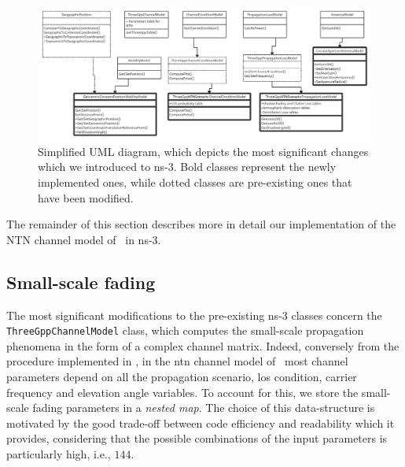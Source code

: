 \begin{figure}[t]
    \includegraphics[width=\textwidth]{Figures/ChannelNtn/uml-diagram.png}
    \caption{Simplified UML diagram, which depicts the most significant changes which we introduced to ns-3. Bold classes represent the newly implemented ones, while dotted classes are pre-existing ones that have been modified.}
    \label{fig:ntn-uml}
\end{figure}

The remainder of this section describes more in detail our implementation of the NTN channel model of~\cite{38811} in ns-3. 

\subsection{Small-scale fading}
The most significant modifications to the pre-existing ns-3 classes concern the \texttt{Three\-Gpp\-Channel\-Model} class, which computes the small-scale propagation phenomena in the form of a complex channel matrix. Indeed, conversely from the procedure implemented in \cite{zugno20implementation}, in the \gls{ntn} channel model of~\cite{38811} most channel parameters depend on all the propagation scenario, \gls{los} condition, carrier frequency and elevation angle variables.  
To account for this, we store the small-scale fading parameters in a \emph{nested map}. The choice of this data-structure is motivated by the good trade-off between code efficiency and readability which it provides, considering that the possible combinations of the input parameters is particularly high, i.e., $144$.

